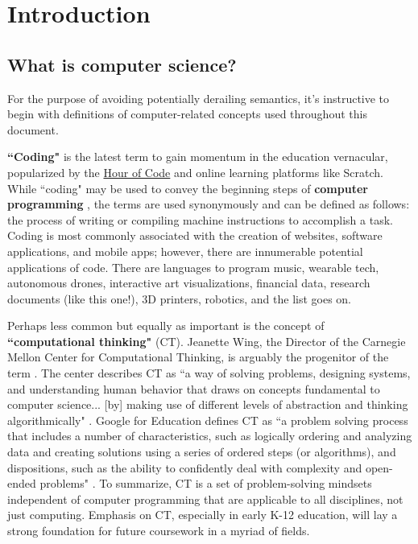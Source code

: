 
\chapter{Introduction} %

\label{Introduction} %



\section{What is computer science?}
For the purpose of avoiding potentially derailing semantics, it's instructive to begin with definitions of computer-related concepts used throughout this document. \par
\textbf{``Coding"} is the latest term to gain momentum in the education vernacular, popularized by the \href{https://hourofcode.com/us}{Hour of Code} and online learning platforms like Scratch. While ``coding" may be used to convey the beginning steps of \textbf{computer programming} \cite{huffpo}, the terms are used synonymously and can be defined as follows: the process of writing or compiling machine instructions to accomplish a task. Coding is most commonly associated with the creation of websites, software applications, and mobile apps; however, there are innumerable potential applications of code. There are languages to program music, wearable tech, autonomous drones, interactive art visualizations, financial data, research documents (like this one!), 3D printers, robotics, and the list goes on. \par
Perhaps less common but equally as important is the concept of \textbf{``computational thinking"} (CT). Jeanette Wing, the Director of the Carnegie Mellon Center for Computational Thinking, is arguably the progenitor of the term \cite{backtoschool}. The center describes CT as ``a way of solving problems, designing systems, and understanding human behavior that draws on concepts fundamental to computer science... [by] making use of different levels of abstraction and thinking algorithmically" \cite{cmct}. Google for Education defines CT as ``a problem solving process that includes a number of characteristics, such as logically ordering and analyzing data and creating solutions using a series of ordered steps (or algorithms), and dispositions, such as the ability to confidently deal with complexity and open-ended problems" \cite{googed}. To summarize, CT is a set of problem-solving mindsets independent of computer programming that are applicable to all disciplines, not just computing. Emphasis on CT, especially in early K-12 education, will lay a strong foundation for future coursework in a myriad of fields.\par

